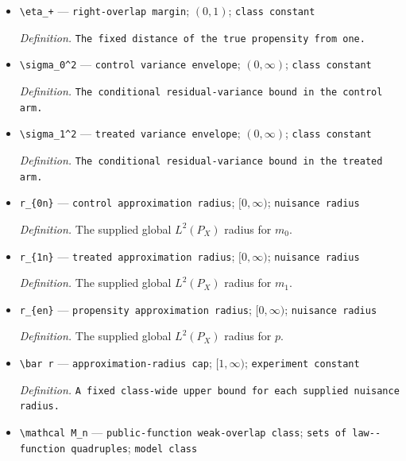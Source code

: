 \documentclass{article}
\begin{document}
\begin{itemize}
  \item \texttt{\textbackslash{}\allowbreak{}eta\_\allowbreak{}+\allowbreak{}} --- \texttt{right-\allowbreak{}overlap margin}; \((0,1)\); \texttt{class constant}
  \par\smallskip\noindent\emph{Definition.} \texttt{The fixed distance of the true propensity from one.}
  \item \texttt{\textbackslash{}\allowbreak{}sigma\_\allowbreak{}0\textasciicircum{}2} --- \texttt{control variance envelope}; \((0,\infty)\); \texttt{class constant}
  \par\smallskip\noindent\emph{Definition.} \texttt{The conditional residual-\allowbreak{}variance bound in the control arm.}
  \item \texttt{\textbackslash{}\allowbreak{}sigma\_\allowbreak{}1\textasciicircum{}2} --- \texttt{treated variance envelope}; \((0,\infty)\); \texttt{class constant}
  \par\smallskip\noindent\emph{Definition.} \texttt{The conditional residual-\allowbreak{}variance bound in the treated arm.}
  \item \texttt{r\_\allowbreak{}\{0n\}\allowbreak{}} --- \texttt{control approximation radius}; \([0,\infty)\); \texttt{nuisance radius}
  \par\smallskip\noindent\emph{Definition.} The supplied global \(L^2(P_X)\) radius for \(m_0\).
  \item \texttt{r\_\allowbreak{}\{1n\}\allowbreak{}} --- \texttt{treated approximation radius}; \([0,\infty)\); \texttt{nuisance radius}
  \par\smallskip\noindent\emph{Definition.} The supplied global \(L^2(P_X)\) radius for \(m_1\).
  \item \texttt{r\_\allowbreak{}\{en\}\allowbreak{}} --- \texttt{propensity approximation radius}; \([0,\infty)\); \texttt{nuisance radius}
  \par\smallskip\noindent\emph{Definition.} The supplied global \(L^2(P_X)\) radius for \(p\).
  \item \texttt{\textbackslash{}\allowbreak{}bar r} --- \texttt{approximation-\allowbreak{}radius cap}; \([1,\infty)\); \texttt{experiment constant}
  \par\smallskip\noindent\emph{Definition.} \texttt{A fixed class-\allowbreak{}wide upper bound for each supplied nuisance radius.}
  \item \texttt{\textbackslash{}\allowbreak{}mathcal M\_\allowbreak{}n} --- \texttt{public-\allowbreak{}function weak-\allowbreak{}overlap class}; \texttt{sets of law-\allowbreak{}-\allowbreak{}function quadruples}; \texttt{model class}

\end{itemize}
\end{document}
